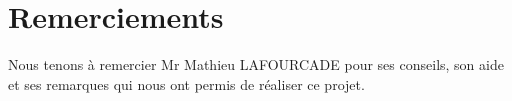 \documentclass[12pt,a4paper]{report}
\begin{document}



\section*{Remerciements}

Nous tenons à remercier Mr Mathieu LAFOURCADE pour ses conseils, son aide et ses remarques qui nous ont permis de réaliser ce projet.

\newpage

\tableofcontents
\listoffigures

\newpage



\end{document}
